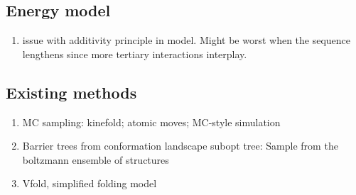 \documentclass[a4paper,12pt]{article}
\begin{document}
\subsection{Energy model}
\label{sec:orgf036e64}
\begin{enumerate}
\item issue with additivity principle in model. Might be worst when the sequence
lengthens since more tertiary interactions interplay.
\end{enumerate}
\subsection{Existing methods}
\label{sec:org9407dfa}
\begin{enumerate}
\item MC sampling: kinefold; atomic moves; MC-style simulation
\item Barrier trees from conformation landscape subopt tree: Sample from the
boltzmann ensemble of structures
\item Vfold, simplified folding model
\end{enumerate}

\clearpage
\end{document}
